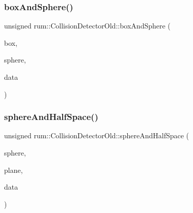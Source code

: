\mbox{\label{classrum_1_1_collision_detector_old_abddbc64dde369508429cf2d5867d2030}} 
\subsubsection{\texorpdfstring{box\+And\+Sphere()}{boxAndSphere()}}
{\footnotesize\ttfamily unsigned rum\+::\+Collision\+Detector\+Old\+::box\+And\+Sphere (\begin{DoxyParamCaption}\item[{const \mbox{\hyperlink{classrum_1_1_collision_box}{Collision\+Box}} \&}]{box,  }\item[{const \mbox{\hyperlink{classrum_1_1_collision_sphere}{Collision\+Sphere}} \&}]{sphere,  }\item[{\mbox{\hyperlink{classrum_1_1_collision_data}{Collision\+Data}} $\ast$}]{data }\end{DoxyParamCaption})\hspace{0.3cm}{\ttfamily [static]}}

\mbox{\label{classrum_1_1_collision_detector_old_afc207ecbfe631676d86a8daea4735243}} 
\subsubsection{\texorpdfstring{sphere\+And\+Half\+Space()}{sphereAndHalfSpace()}}
{\footnotesize\ttfamily unsigned rum\+::\+Collision\+Detector\+Old\+::sphere\+And\+Half\+Space (\begin{DoxyParamCaption}\item[{const \mbox{\hyperlink{classrum_1_1_collision_sphere}{Collision\+Sphere}} \&}]{sphere,  }\item[{const \mbox{\hyperlink{classrum_1_1_collision_plane}{Collision\+Plane}} \&}]{plane,  }\item[{\mbox{\hyperlink{classrum_1_1_collision_data}{Collision\+Data}} $\ast$}]{data }\end{DoxyParamCaption})\hspace{0.3cm}{\ttfamily [static]}}

